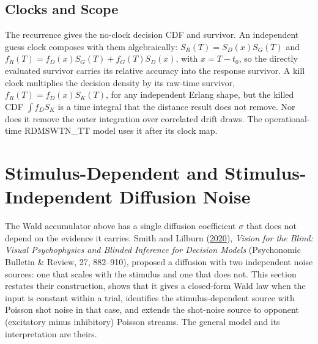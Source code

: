 \documentclass[12pt]{article}
\begin{document}
\subsection{Clocks and Scope}
The recurrence gives the no-clock decision CDF and survivor. An independent guess clock composes with them algebraically: $S_R(T)=S_D(x)S_G(T)$ and $f_R(T)=f_D(x)S_G(T)+f_G(T)S_D(x)$, with $x=T-t_0$, so the directly evaluated survivor carries its relative accuracy into the response survivor. A kill clock multiplies the decision density by its raw-time survivor, $f_R(T)=f_D(x)S_K(T)$, for any independent Erlang shape, but the killed CDF $\int f_DS_K$ is a time integral that the distance result does not remove. Nor does it remove the outer integration over correlated drift draws. The operational-time RDMSWTN\_TT model uses it after its clock map.

\section{Stimulus-Dependent and Stimulus-Independent Diffusion Noise}
\label{sec:two-noise}
The Wald accumulator above has a single diffusion coefficient $\sigma$ that does not depend on the evidence it carries. Smith and Lilburn (\href{https://doi.org/10.3758/s13423-020-01742-7}{2020}), \emph{Vision for the Blind: Visual Psychophysics and Blinded Inference for Decision Models} (Psychonomic Bulletin \& Review, 27, 882--910), proposed a diffusion with two independent noise sources: one that scales with the stimulus and one that does not. This section restates their construction, shows that it gives a closed-form Wald law when the input is constant within a trial, identifies the stimulus-dependent source with Poisson shot noise in that case, and extends the shot-noise source to opponent (excitatory minus inhibitory) Poisson streams. The general model and its interpretation are theirs.
\end{document}
